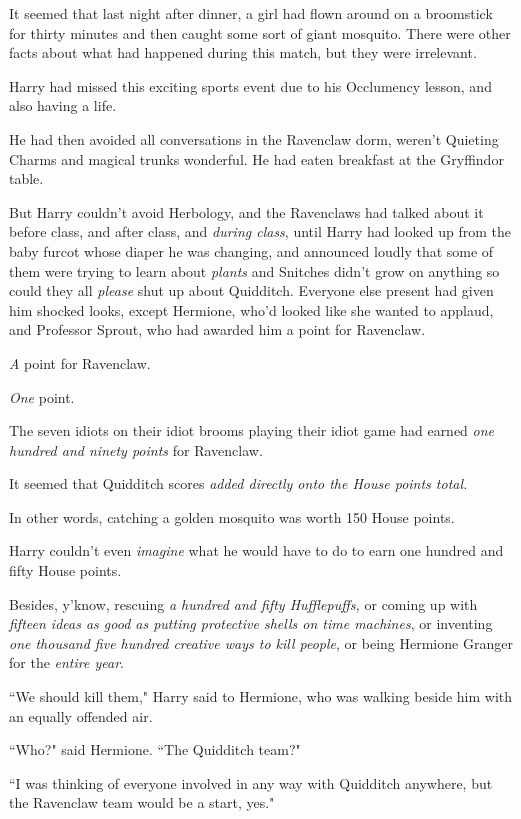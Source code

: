 It seemed that last night after dinner, a girl had flown around on a broomstick for thirty minutes and then caught some sort of giant mosquito. There were other facts about what had happened during this match, but they were irrelevant.

Harry had missed this exciting sports event due to his Occlumency lesson, and also having a life.

He had then avoided all conversations in the Ravenclaw dorm, weren't Quieting Charms and magical trunks wonderful. He had eaten breakfast at the Gryffindor table.

But Harry couldn't avoid Herbology, and the Ravenclaws had talked about it before class, and after class, and \emph{during class}, until Harry had looked up from the baby furcot whose diaper he was changing, and announced loudly that some of them were trying to learn about \emph{plants} and Snitches didn't grow on anything so could they all \emph{please} shut up about Quidditch. Everyone else present had given him shocked looks, except Hermione, who'd looked like she wanted to applaud, and Professor Sprout, who had awarded him a point for Ravenclaw.

\emph{A} point for Ravenclaw.

\emph{One} point.

The seven idiots on their idiot brooms playing their idiot game had earned \emph{one hundred and ninety points} for Ravenclaw.

It seemed that Quidditch scores \emph{added directly onto the House points total.}

In other words, catching a golden mosquito was worth 150 House points.

Harry couldn't even \emph{imagine} what he would have to do to earn one hundred and fifty House points.

Besides, y'know, rescuing \emph{a hundred and fifty Hufflepuffs,} or coming up with \emph{fifteen ideas as good as putting protective shells on time machines}, or inventing \emph{one thousand five hundred creative ways to kill people}, or being Hermione Granger for the \emph{entire year}.

``We should kill them," Harry said to Hermione, who was walking beside him with an equally offended air.

``Who?" said Hermione. ``The Quidditch team?"

``I was thinking of everyone involved in any way with Quidditch anywhere, but the Ravenclaw team would be a start, yes."

